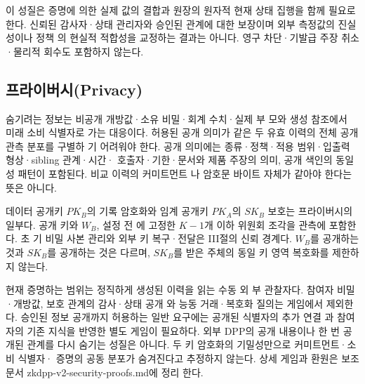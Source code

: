 이 성질은 증명에 의한 실제 값의 결합과 원장의 원자적 현재
상태 집행을 함께 필요로 한다. 신뢰된 감사자·상태 관리자와
승인된 관계에 대한 보장이며 외부 측정값의 진실성이나 정책
의 현실적 적합성을 교정하는 결과는 아니다. 영구 차단·기발급
주장 취소·물리적 회수도 포함하지 않는다.

\subsection{프라이버시(Privacy)}
숨기려는 정보는 비공개 개방값·소유 비밀·회계 수치·실제 부
모와 생성 참조에서 미래 소비 식별자로 가는 대응이다. 허용된
공개 의미가 같은 두 유효 이력의 전체 공개 관측 분포를 구별하
기 어려워야 한다. 공개 의미에는 종류·정책·적용 범위·입출력
형상·sibling 관계·시간· 호출자·기한·문서와 제품 주장의 의미,
공개 색인의 동일성 패턴이 포함된다. 비교 이력의 커미트먼트
나 암호문 바이트 자체가 같아야 한다는 뜻은 아니다.

데이터 공개키 \(PK_{B}\)의 기록 암호화와 임계 공개키 \(PK_{A}\)의
\(SK_{B}\) 보호는 프라이버시의 일부다. 공개 키와 \(W_{B}\), 설정 전
에 고정한 \(K−1\)개 이하 위원회 조각을 관측에 포함한다. 초
기 비밀 사본 관리와 외부 키 복구·전달은 III절의 신뢰 경계다.
\(W_{B}\)를 공개하는 것과 \(SK_{B}\)를 공개하는 것은 다르며, \(SK_{B}\)를
받은 주체의 동일 키 영역 복호화를 제한하지 않는다.

현재 증명하는 범위는 정직하게 생성된 이력을 읽는 수동 외
부 관찰자다. 참여자 비밀·개방값, 보호 관계의 감사·상태 공개
와 능동 거래·복호화 질의는 게임에서 제외한다. 승인된 정보
공개까지 허용하는 일반 요구에는 공개된 식별자의 추가 연결
과 참여자의 기존 지식을 반영한 별도 게임이 필요하다. 외부
DPP의 공개 내용이나 한 번 공개된 관계를 다시 숨기는 성질은
아니다. 두 키 암호화의 기밀성만으로 커미트먼트·소비 식별자·
증명의 공동 분포가 숨겨진다고 추정하지 않는다. 상세 게임과
환원은 보조 문서 zkdpp-v2-security-proofs.md에 정리
한다.
